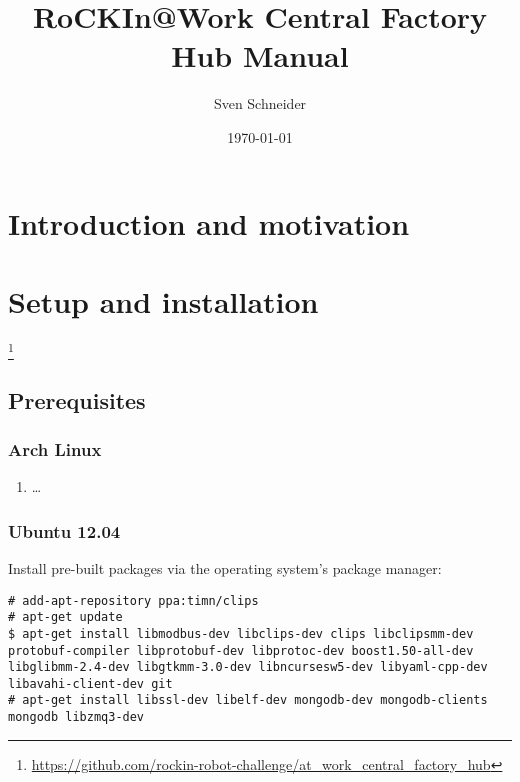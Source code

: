 \documentclass{article}
\title{RoCKIn@Work Central Factory Hub Manual}
\author{Sven Schneider}
\date{\today}
\begin{document}
\maketitle

\section{Introduction and motivation}

\section{Setup and installation}
\footnote{\url{https://github.com/rockin-robot-challenge/at_work_central_factory_hub}}

\subsection{Prerequisites}

\subsubsection{Arch Linux}
\begin{enumerate}
\item \ldots
\end{enumerate}

\subsubsection{Ubuntu 12.04}
Install pre-built packages via the operating system's package manager:
\begin{lstlisting}
# add-apt-repository ppa:timn/clips
# apt-get update
$ apt-get install libmodbus-dev libclips-dev clips libclipsmm-dev protobuf-compiler libprotobuf-dev libprotoc-dev boost1.50-all-dev libglibmm-2.4-dev libgtkmm-3.0-dev libncursesw5-dev libyaml-cpp-dev libavahi-client-dev git
# apt-get install libssl-dev libelf-dev mongodb-dev mongodb-clients mongodb libzmq3-dev
\end{lstlisting}
\end{document}
